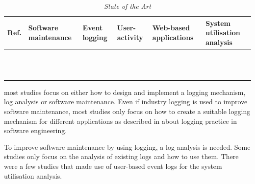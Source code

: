\begin{table}[!htb]
	\centering
	\caption[State of the Art]
	{\textit{State of the Art}}
	\label{tbl:CH1_StateOfTheART}
	\begin{tabularx}{\textwidth}{|p{}|Y|Y|Y|Y|Y|}
		\hline \textbf{Ref.} & \RaggedRight \textbf{Software maintenance} & \RaggedRight \textbf{Event logging} & \RaggedRight \textbf{User-activity} & \RaggedRight \textbf{Web-based applications} & \textbf{System utilisation analysis} \\
		\hline \RaggedRight \cite{Ackermann2009, Mamone1994, Galster2019, Reimanis2016, Snipes2018, Ogheneovo2014,Stark1996} & \cmark & \xmark & \xmark & \xmark & \xmark \\
		\hline \cite{Tang2010} & \cmark & \cmark & \xmark & \xmark & \xmark \\
		\hline \cite{Port2017} & \cmark & \xmark & \xmark & \xmark & \cmark \\
		\hline \cite{Zhu2015} & \cmark & \cmark & \cmark & \xmark & \xmark \\
		\hline \cite{Cinque2013} & \xmark & \cmark & \xmark & \xmark & \cmark \\
		\hline \cite{Baccanico2014, Zhu2019,Kherbouche2017, Bekeneva2020, Jia2018} & \xmark & \cmark & \xmark & \xmark & \xmark \\
		\hline \cite{Pecchia2015} & \xmark & \cmark & \xmark & \xmark & \cmark \\
		\hline \cite{Slaninova2014, Dhanalakshmi2016, Waqar2017} & \xmark & \xmark & \cmark & \cmark & \cmark \\
		\hline \cite{Hasiloglu2018} & \xmark & \xmark & \xmark & \cmark & \cmark \\
		\hline \cite{Kocsis2012} & \xmark & \xmark & \xmark & \cmark & \cmark \\
		\hline \cite{Rong2020} & \xmark & \cmark & \xmark & \xmark & \cmark \\
		\hline \cite{Wang2008, Paliouras1999} & \xmark & \xmark & \xmark & \cmark & \cmark \\
		\hline
	\end{tabularx}
\end{table}

 most studies focus on either how to design and implement a logging mechanism, log analysis or software maintenance. Even if industry logging is used to improve software maintenance, most studies only focus on how to create a suitable logging mechanism for different applications as described in  about logging practice in software engineering.\par To improve software maintenance by using logging, a log analysis is needed. Some studies only focus on the analysis of existing logs and how to use them. There were a few studies that made use of user-based event logs for the system utilisation analysis.

